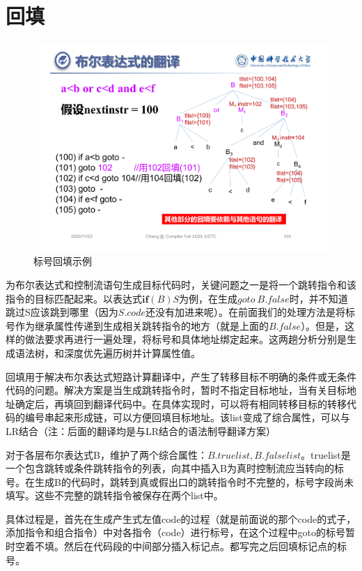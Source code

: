 \documentclass[]{report}
\begin{document}
	\section{回填}
		\begin{figure}[h]
			\centering
			\begin{minipage}{40em}
				\centering
				\includegraphics[scale = 0.4]{images/backpatching.pdf}
			\end{minipage}
			\caption{标号回填示例}
		\end{figure}
		为布尔表达式和控制流语句生成目标代码时，关键问题之一是将一个跳转指令和该指令的目标匹配起来。以表达式$\mathbf{if}(B)S$为例，在生成$goto\ B.false$时，并不知道跳过S应该跳到哪里（因为$S.code$还没有加进来呢）。在前面我们的处理方法是将标号作为继承属性传递到生成相关跳转指令的地方（就是上面的$B.false$）。但是，这样的做法要求再进行一遍处理，将标号和具体地址绑定起来。这两趟分析分别是生成语法树，和深度优先遍历树并计算属性值。\par
		回填用于解决布尔表达式短路计算翻译中，产生了转移目标不明确的条件或无条件代码的问题。解决方案是当生成跳转指令时，暂时不指定目标地址，当有关目标地址确定后，再填回到翻译代码中。在具体实现时，可以将有相同转移目标的转移代码的编号串起来形成链，可以方便回填目标地址。该list变成了综合属性，可以与LR结合（注：后面的翻译均是与LR结合的语法制导翻译方案）\par
		对于各层布尔表达式B，维护了两个综合属性：$B.truelist,B.falselist$。truelist是一个包含跳转或条件跳转指令的列表，向其中插入B为真时控制流应当转向的标号。在生成B的代码时，跳转到真或假出口的跳转指令时不完整的，标号字段尚未填写。这些不完整的跳转指令被保存在两个list中。\par
		具体过程是，首先在生成产生式左值code的过程（就是前面说的那个code的式子，添加指令和组合指令）中对各指令（code）进行标号，在这个过程中goto的标号暂时空着不填。然后在代码段的中间部分插入标记点。都写完之后回填标记点的标号。\par
\end{document}

